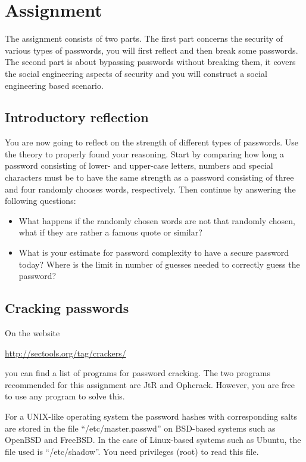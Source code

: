 


\section{Assignment}%
\label{sec:tasks}

The assignment consists of two parts.
The first part concerns the security of various types of passwords, you will 
first reflect and then break some passwords.
The second part is about bypassing passwords without breaking them, it covers 
the social engineering aspects of security and you will construct a social 
engineering based scenario.

\subsection{Introductory reflection}%
\label{sec:reflection}

You are now going to reflect on the strength of different types of passwords.
Use the theory to properly found your reasoning.
Start by comparing how long a password consisting of lower- and upper-case 
letters, numbers and special characters must be to have the same strength as 
a password consisting of three and four randomly chooses words, respectively.
Then continue by answering the following questions:
\begin{itemize}
  \item What happens if the randomly chosen words are not that randomly chosen, 
    what if they are rather a famous quote or similar?

  \item What is your estimate for password complexity to have a secure password 
    today?
    Where is the limit in number of guesses needed to correctly guess the 
    password?
\end{itemize}

\subsection{Cracking passwords}

On the website
\begin{center}
  \url{http://sectools.org/tag/crackers/}
\end{center}
you can find a list of programs for password cracking.
The two programs recommended for this assignment are
\ac{JtR} and Ophcrack.
However, you are free to use any program to solve this.

For a UNIX-like operating system the password hashes with corresponding salts 
are stored in the file \enquote{/etc/master.passwd} on BSD-based systems such 
as OpenBSD and FreeBSD\@.
In the case of Linux-based systems such as Ubuntu, the file used is 
\enquote{/etc/shadow}.
You need privileges (root) to read this file.

